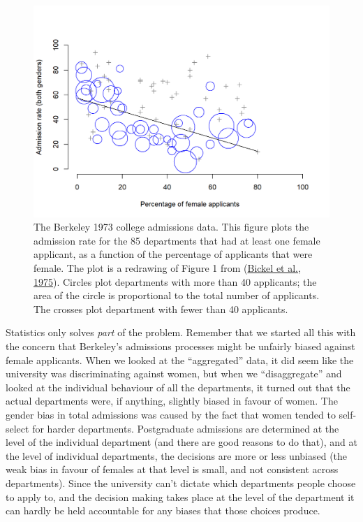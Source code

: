 \documentclass[
]{book}
\theoremstyle{definition}
\theoremstyle{definition}
\theoremstyle{definition}
\theoremstyle{definition}
\theoremstyle{remark}
\begin{document}
\begin{figure}

{\centering \includegraphics[width=0.66\linewidth]{resources/image/berkeley} 

}

\caption[The Berkeley 1973 college admissions data.]{The Berkeley 1973 college admissions data. This figure plots the admission rate for the 85 departments that had at least one female applicant, as a function of the percentage of applicants that were female. The plot is a redrawing of Figure 1 from (\protect\hyperlink{ref-Bickel1975}{Bickel et al., 1975}). Circles plot departments with more than 40 applicants; the area of the circle is proportional to the total number of applicants. The crosses plot department with fewer than 40 applicants.}\label{fig:berkeley}
\end{figure}

Statistics only solves \emph{part} of the problem. Remember that we started all this with the concern that Berkeley's admissions processes might be unfairly biased against female applicants. When we looked at the ``aggregated'' data, it did seem like the university was discriminating against women, but when we ``disaggregate'' and looked at the individual behaviour of all the departments, it turned out that the actual departments were, if anything, slightly biased in favour of women. The gender bias in total admissions was caused by the fact that women tended to self-select for harder departments. Postgraduate admissions are determined at the level of the individual department (and there are good reasons to do that), and at the level of individual departments, the decisions are more or less unbiased (the weak bias in favour of females at that level is small, and not consistent across departments). Since the university can't dictate which departments people choose to apply to, and the decision making takes place at the level of the department it can hardly be held accountable for any biases that those choices produce.
\end{document}
